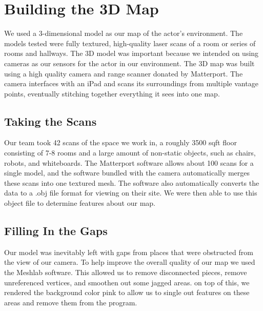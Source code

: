\documentclass[a4paper,11pt]{article}
\begin{document}
  \section{Building the 3D Map}
  We used a 3-dimensional model as our map of the actor's environment. The models tested were fully textured, high-quality laser scans of a room or series of rooms and hallways. The 3D model was important because we intended on using cameras as our sensors for the actor in our environment. The 3D map was built using a high quality camera and range scanner donated by Matterport. The camera interfaces with an iPad and scans its surroundings from multiple vantage points, eventually stitching together everything it sees into one map. %
  
  \subsection{Taking the Scans}
 Our team took 42 scans of the space we work in, a roughly 3500 sqft floor consisting of 7-8 rooms and a large amount of non-static objects, such as chairs, robots, and whiteboards. The Matterport software allows about 100 scans for a single model, and the software bundled with the camera automatically merges these scans into one textured mesh. The software also automatically converts the data to a .obj file format for viewing on their site. We were then able to use this object file to determine features about our map.

  \subsection{Filling In the Gaps}
  Our model was inevitably left with gaps from places that were obstructed from the view of our camera. To help improve the overall quality of our map we used the Meshlab software. This allowed us to remove disconnected pieces, remove unreferenced vertices, and smoothen out some jagged areas. on top of this, we rendered the background color pink to allow us to single out features on these areas and remove them from the program.
  
\end{document}
